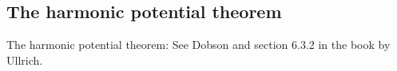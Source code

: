 \documentclass[aip,jcp,reprint,floatfix]{revtex4-1}
\begin{document}
\begin{appendices}
\section{The harmonic potential theorem}
The harmonic potential theorem: See Dobson\cite{HarmonicPotentialTheorem} and section 6.3.2 in the book by Ullrich\cite{TD_DFT_Ullrich_Book}.



\end{appendices}
\newpage


\end{document}
